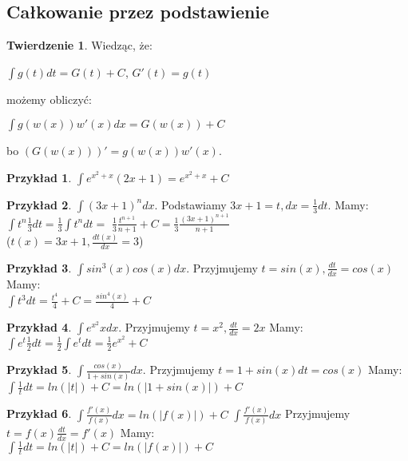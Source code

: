 \documentclass{article}
\theoremstyle{definition}
\theoremstyle{definition}
\newtheorem{tw}{Twierdzenie}[subsection]
\theoremstyle{definition}
\newtheorem{pk}{Przykład}[subsection]
\theoremstyle{definition}
\begin{document}
\subsection{Całkowanie przez podstawienie}

\begin{tw}
    Wiedząc, że:
    \begin{center}
        $\int g(t) dt = G(t) + C$, $G'(t)=g(t)$
    \end{center}
    możemy obliczyć:
    \begin{center}
        $\int g(w(x)) w'(x) dx = G(w(x)) + C$
    \end{center}
    bo $(G(w(x)))'=g(w(x))w'(x)$.
\end{tw}

\begin{pk}
    $\int e^{x^2+x} (2x+1) = e^{x^2+x} + C$
\end{pk}

\begin{pk}
    $\int (3x+1)^n dx$. Podstawiamy $3x+1=t, dx=\frac{1}{3} dt$. Mamy:\\
    $\int t^n \frac{1}{3} dt = \frac{1}{3} \int t^n dt =$
    $\frac{1}{3} \frac{t^{n+1}}{n+1} + C = \frac{1}{3} \frac{(3x+1)^{n+1}}{n+1}$\\
    ($t(x)=3x+1, \frac{dt(x)}{dx}=3$)
\end{pk}

\begin{pk}
    $\int sin^3(x) cos(x) dx$. Przyjmujemy $t=sin(x), \frac{dt}{dx} = cos(x)$ Mamy:\\
    $\int t^3dt = \frac{t^4}{4} + C = \frac{sin^4(x)}{4} + C$
\end{pk}

\begin{pk}
    $\int e^{x^2}x dx$. Przyjmujemy $t=x^2, \frac{dt}{dx} = 2x$ Mamy:\\
    $\int e^{t}\frac{1}{2} dt=\frac{1}{2}\int e^t dt = \frac{1}{2} e^{x^2} + C$
\end{pk}

\begin{pk}
    $\int \frac{cos(x)}{1+sin(x)} dx$. Przyjmujemy $t=1+sin(x) dt=cos(x)$ Mamy:\\
    $\int \frac{1}{t} dt = ln(|t|) + C = ln(|1+sin(x)|) + C$
\end{pk}

\begin{pk}
    $\int \frac{f'(x)}{f(x)} dx = ln(|f(x)|) + C$
    $\int \frac{f'(x)}{f(x)} dx$ Przyjmujemy $t=f(x) \frac{dt}{dx} = f'(x)$ Mamy:\\
    $\int \frac{1}{t} dt = ln(|t|) + C = ln(|f(x)|) + C$
\end{pk}
\end{document}
